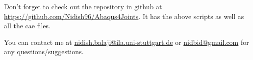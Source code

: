 \documentclass[11pt]{article}
\begin{document}
Don't forget to check out the repository in github at \href{https://github.com/Nidish96/Abaqus4Joints}{https://github.com/Nidish96/Abaqus4Joints}.
It has the above scripts as well as all the cae files.

You can contact me at \href{mailto:nidish.balaji@ila.uni-stuttgart.de}{nidish.balaji@ila.uni-stuttgart.de} or \href{mailto:nidbid@gmail.com}{nidbid@gmail.com} for any questions/suggestions.
\end{document}
